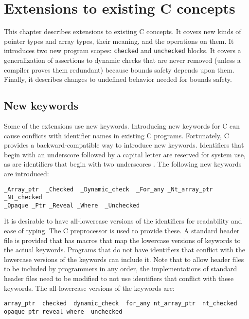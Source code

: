 
\chapter{Extensions to existing C concepts}
\label{chapter:core-extensions}

This chapter describes extensions to existing C concepts. 
It covers new kinds of pointer types and array types, their meaning,
and the operations  on them.   It introduces two
new program scopes: \lstinline+checked+ and \lstinline+unchecked+
blocks. It covers a generalization of assertions to 
dynamic checks that are never  removed (unless a compiler
proves them redundant) because bounds safety depends upon them. 
Finally, it describes changes to
undefined behavior needed for bounds safety.

\section{New keywords}
Some of the extensions use new keywords.   Introducing new keywords
for C can cause conflicts with identifier names in existing C programs.
Fortunately, C provides a backward-compatible way to introduce new
keywords.  Identifiers that begin with an underscore followed by a
capital letter are reserved for system use, as are identifiers that
begin with two underscores \cite[Section 7.1.3]{ISO2011}. The following
new keywords are introduced:
\begin{lstlisting}
_Array_ptr  _Checked  _Dynamic_check  _For_any _Nt_array_ptr  _Nt_checked 
_Opaque _Ptr _Reveal _Where  _Unchecked
\end{lstlisting}

It is desirable to have all-lowercase versions of the
identifiers for readability and ease of typing. The C
preprocessor is used to provide these. A standard header
file  is provided that has macros
that map the lowercase versions of keywords to the actual keywords.
Programs that do not have identifiers that conflict with the
lowercase versions of the keywords can include it.
Note that to allow header files to be included by programmers in any order,
the implementations of standard header files need to be modified to
not use identifiers that conflict with these keywords.
The all-lowercase versions of the keywords are:
\begin{lstlisting}
array_ptr  checked  dynamic_check  for_any nt_array_ptr  nt_checked 
opaque ptr reveal where  unchecked
\end{lstlisting}

